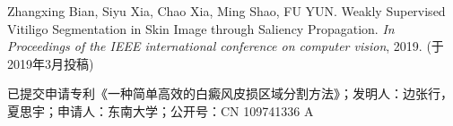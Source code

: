 \begin{resume}


  \begin{publications}
    \item Zhangxing Bian, Siyu Xia, Chao Xia, Ming Shao, FU YUN. Weakly Supervised Vitiligo Segmentation in Skin Image through Saliency
Propagation. \textit{In Proceedings of the IEEE international conference on computer vision}, 2019. (于2019年3月投稿)
    \end{publications}

 
  \begin{achievements}
    \item 已提交申请专利《一种简单高效的白癜风皮损区域分割方法》；发明人：边张行，夏思宇；申请人：东南大学；公开号：CN 109741336 A 
  \end{achievements}

\end{resume}
